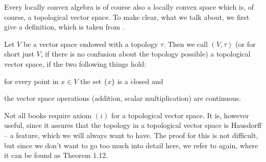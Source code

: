 Every locally convex algebra is of course also a locally convex space which 
is, of course, a topological vector space. To make clear, what we talk about, 
we first give a definition, which is taken from \cite{Rudin:Blue}.
\begin{definition}
	\label{Def:TVSpace}
	Let $V$ be a vector space endowed with a topology $\tau$. Then we call 
	$(V, \tau)$ (or for short just $V$, if there is no confusion about the 
	topology possible) a topological vector space, if the two following things 
	hold:
	\begin{definitionlist}
		\item
		for every point in $x \in V$ the set $\{x\} $ is a closed and
		
		\item
		the vector space operations (addition, scalar multiplication) are 
		continuous.
	\end{definitionlist}
\end{definition}
Not all books require axiom $(i)$ for a topological vector space. It is, 
however useful, since it assures that the topology in a topological vector 
space is Hausdorff -- a feature, which we will always want to have. The proof 
for this is not difficult, but since we don't want to go too much into detail 
here, we refer to \cite{Rudin:Blue} again, where it can be found as Theorem 
1.12.


